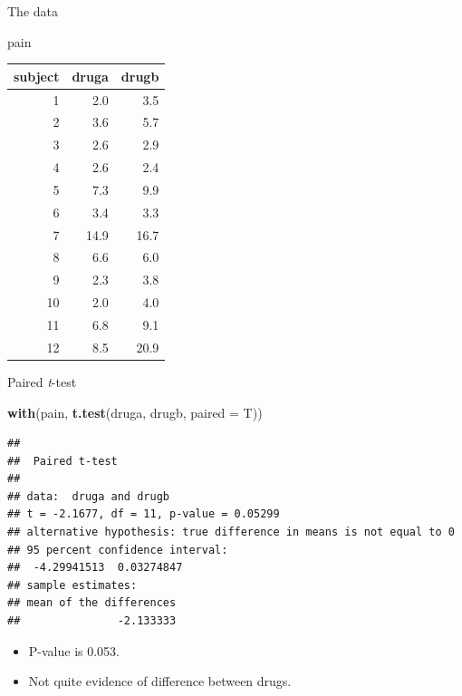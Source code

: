\documentclass[
  ignorenonframetext,
]{beamer}
\newenvironment{Shaded}{\begin{snugshade}}{\end{snugshade}}
\newcommand{\DataTypeTok}[1]{\textcolor[rgb]{0.13,0.29,0.53}{#1}}
\newcommand{\KeywordTok}[1]{\textcolor[rgb]{0.13,0.29,0.53}{\textbf{#1}}}
\newcommand{\NormalTok}[1]{#1}
\providecommand{\tightlist}{%
  \setlength{\itemsep}{0pt}\setlength{\parskip}{0pt}}
\begin{document}
\begin{frame}[fragile]{The data}
\protect\hypertarget{the-data}{}
\begin{Shaded}
\begin{Highlighting}[]
\NormalTok{pain}
\end{Highlighting}
\end{Shaded}

\begin{longtable}[]{@{}rrr@{}}
\toprule
subject & druga & drugb\tabularnewline
\midrule
\endhead
1 & 2.0 & 3.5\tabularnewline
2 & 3.6 & 5.7\tabularnewline
3 & 2.6 & 2.9\tabularnewline
4 & 2.6 & 2.4\tabularnewline
5 & 7.3 & 9.9\tabularnewline
6 & 3.4 & 3.3\tabularnewline
7 & 14.9 & 16.7\tabularnewline
8 & 6.6 & 6.0\tabularnewline
9 & 2.3 & 3.8\tabularnewline
10 & 2.0 & 4.0\tabularnewline
11 & 6.8 & 9.1\tabularnewline
12 & 8.5 & 20.9\tabularnewline
\bottomrule
\end{longtable}
\end{frame}

\begin{frame}[fragile]{Paired \emph{t}-test}
\protect\hypertarget{paired-t-test}{}
\small

\begin{Shaded}
\begin{Highlighting}[]
\KeywordTok{with}\NormalTok{(pain, }\KeywordTok{t.test}\NormalTok{(druga, drugb, }\DataTypeTok{paired =}\NormalTok{ T))}
\end{Highlighting}
\end{Shaded}

\begin{verbatim}
## 
##  Paired t-test
## 
## data:  druga and drugb
## t = -2.1677, df = 11, p-value = 0.05299
## alternative hypothesis: true difference in means is not equal to 0
## 95 percent confidence interval:
##  -4.29941513  0.03274847
## sample estimates:
## mean of the differences 
##               -2.133333
\end{verbatim}

\normalsize

\begin{itemize}
\tightlist
\item
  P-value is 0.053.
\item
  Not quite evidence of difference between drugs.
\end{itemize}
\end{frame}
\end{document}
